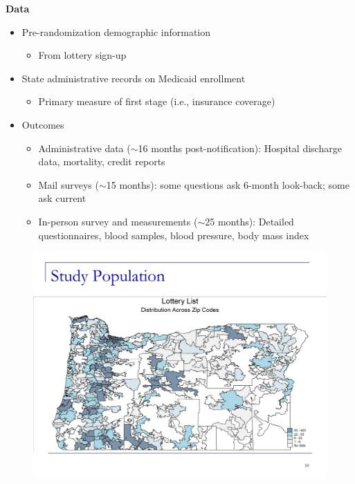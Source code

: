 \documentclass[notes=show]{beamer}
\begin{document}
\begin{frame}[plain]	
	\begin{center}
	\textbf{Data}
	\end{center}
	
	\begin{itemize}
	\item Pre-randomization demographic information
		\begin{itemize}
		\item From lottery sign-up
		\end{itemize}
	\item State administrative records on Medicaid enrollment
		\begin{itemize}
		\item Primary measure of first stage (i.e., insurance coverage)
		\end{itemize}
	\item Outcomes
		\begin{itemize}
		\item Administrative data ($\sim$16 months post-notification): Hospital discharge data, mortality, credit reports
		\item Mail surveys ($\sim$15 months): some questions ask 6-month look-back; some ask current
		\item In-person survey and measurements ($\sim$25 months): Detailed questionnaires, blood samples, blood pressure, body mass index
		\end{itemize}
	\end{itemize}
\end{frame}

\begin{frame}[plain]

\begin{figure}
\includegraphics[scale=0.35]{./lecture_includes/baicker_1.pdf}
\end{figure}

\end{frame}
\end{document}

